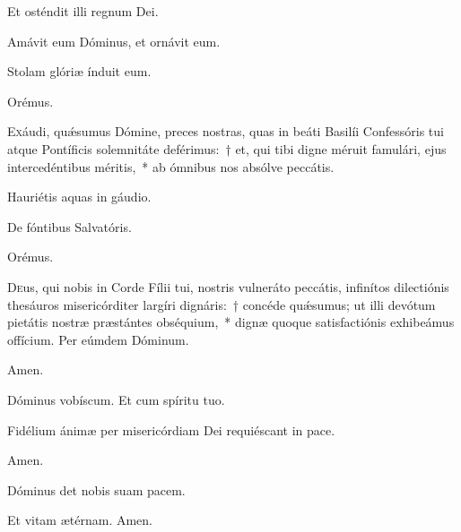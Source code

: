 \rr Et osténdit illi regnum Dei.

\zerobaroffsettextleft
\zerobaroffsettextright
{}
\resetbaroffsettextleft
\resetbaroffsettextright

\vv Amávit eum Dóminus, et ornávit eum.

\rr Stolam glóriæ índuit eum.

Orémus.

\lettrine{E}{x}áudi, quǽsumus Dómine, preces nostras, quas in beáti Basilíi Confessóris tui atque Pontíficis solemnitáte deférimus:~† et, qui tibi digne méruit famulári, ejus intercedéntibus méritis,~* ab ómnibus nos absólve peccátis.

 
 \vv Hauriétis aquas in gáudio.

\rr De fóntibus Salvatóris.

Orémus.

\lettrine{D}{e}us, qui nobis in Corde Fílii tui, nostris vulneráto peccátis, infinítos dilectiónis thesáuros misericórditer largíri dignáris:~† concéde quǽsumus; ut illi devótum pietátis nostræ præstántes obséquium,~* dignæ quoque satisfactiónis exhibeámus offícium. Per eúmdem Dóminum.

\rr Amen.

   \vv Dóminus vobíscum. \rr Et cum spíritu tuo.
   
   
  \vv Fidélium ánimæ per misericórdiam Dei requiéscant in pace.
  
  \rr Amen.
  
  
  \secreto
  
\vv Dóminus det nobis suam pacem.
  
\rr Et vitam ætérnam. Amen.


